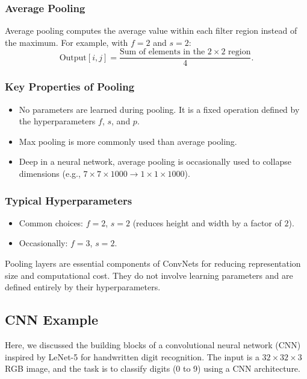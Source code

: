 \documentclass[letterpaper,12pt,notitlepage,twoside]{report}
\begin{document}
\subsubsection*{Average Pooling}
Average pooling computes the average value within each filter region instead of the maximum. For example, with $f=2$ and $s=2$:
\[
\text{Output}[i, j] = \frac{\text{Sum of elements in the $2 \times 2$ region}}{4}.
\]

\subsubsection*{Key Properties of Pooling}
\begin{itemize}[nosep]
    \item No parameters are learned during pooling. It is a fixed operation defined by the hyperparameters $f$, $s$, and $p$.
    \item Max pooling is more commonly used than average pooling.
    \item Deep in a neural network, average pooling is occasionally used to collapse dimensions (e.g., $7 \times 7 \times 1000 \to 1 \times 1 \times 1000$).
\end{itemize}

\subsubsection*{Typical Hyperparameters}
\begin{itemize}[nosep]
    \item Common choices: $f=2$, $s=2$ (reduces height and width by a factor of $2$).
    \item Occasionally: $f=3$, $s=2$.
\end{itemize}

Pooling layers are essential components of ConvNets for reducing representation size and computational cost. They do not involve learning parameters and are defined entirely by their hyperparameters. 

\subsection{CNN Example}
Here, we discussed the building blocks of a convolutional neural network (CNN) inspired by LeNet-5 for handwritten digit recognition. The input is a $32 \times 32 \times 3$ RGB image, and the task is to classify digits (0 to 9) using a CNN architecture.
\end{document}
